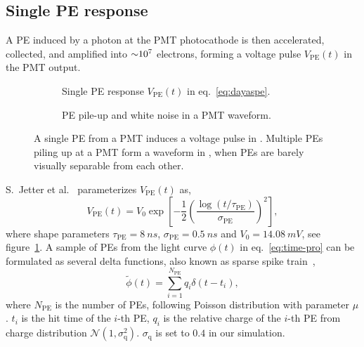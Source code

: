 \subsection{Single PE response}
\label{subsec:spe}

A PE induced by a photon at the PMT photocathode is then accelerated, collected, and amplified into $\num[retain-unity-mantissa=false]{\sim 1e7}$ electrons, forming a voltage pulse $V_\mathrm{PE}(t)$ in the PMT output.
\begin{figure}[H]
  \begin{subfigure}{.49\textwidth}
    \centering
    \resizebox{\textwidth}{!}{}
    \caption{\label{fig:spe} Single PE response $V_\mathrm{PE}(t)$ in eq.~\eqref{eq:dayaspe}.}
  \end{subfigure}
  \begin{subfigure}{.49\textwidth}
    \centering
    \resizebox{\textwidth}{!}{}
    \caption{\label{fig:pile} PE pile-up and white noise in a PMT waveform.}
  \end{subfigure}
  \caption{A single PE from a PMT induces a voltage pulse in .  Multiple PEs piling up at a PMT form a waveform in , when PEs are barely visually separable from each other.}
\end{figure}

S.~Jetter et al.~\cite{jetter_pmt_2012} parameterizes $V_\mathrm{PE}(t)$ as,
\begin{equation}
  V_\mathrm{PE}(t) = V_{0}\exp\left[-\frac{1}{2}\left(\frac{\log(t/\tau_\mathrm{PE})}{\sigma_\mathrm{PE}}\right)^{2}\right],
  \label{eq:dayaspe}
\end{equation}
where shape parameters $\tau_\mathrm{PE}=\SI{8}{ns}$, $\sigma_\mathrm{PE}=\SI{0.5}{ns}$ and $V_{0}=\SI{14.08}{mV}$, see figure~\ref{fig:spe}.  A sample of PEs from the light curve $\phi(t)$ in eq.~\eqref{eq:time-pro} can be formulated as several delta functions, also known as sparse spike train~\cite{levy_reconstruction_1981}, 
\begin{equation}
  \label{eq:lc-sample}
  \tilde{\phi}(t) = \sum_{i=1}^{N_{\mathrm{PE}}} q_i \delta(t-t_i),
\end{equation}
where $N_\mathrm{PE}$ is the number of PEs, following Poisson distribution with parameter $\mu$.  $t_i$ is the hit time of the $i$-th PE, $q_i$ is the relative charge of the $i$-th PE from charge distribution $\mathcal{N}(1,\sigma_\mathrm{q}^2)$.  $\sigma_\mathrm{q}$ is set to $0.4$ in our simulation.

